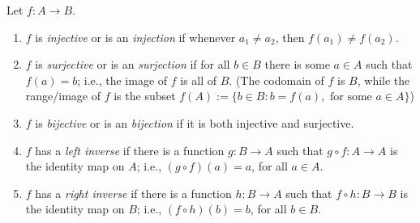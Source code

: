 Let $f:A\to B$.
\begin{enumerate}[(1)]
        \item $f$ is \textit{injective} or is an \textit{injection} if whenever $a_1\neq a_2$, then $f(a_1)\neq f(a_2)$.
        \item $f$ is \textit{surjective} or is an \textit{surjection} if for all $b\in B$ there is some $a\in A$ such that $f(a)=b$; i.e., the image of $f$ is all of $B$. 
        (The codomain of $f$ is $B$, while the range/image of $f$ is the subset $f(A):=\{b\in B:b=f(a), \text{ for some }a\in A\}$)
        \item $f$ is \textit{bijective} or is an \textit{bijection} if it is both injective and surjective.
        \item $f$ has a \textit{left inverse} if there is a function $g:B\to A$ such that $g\circ f:A\to A$ is the identity map on $A$; i.e., $(g\circ f)(a)=a$, for all $a\in A$.
        \item $f$ has a \textit{right inverse} if there is a function $h:B\to A$ such that $f\circ h:B\to B$ is the identity map on $B$; i.e., $(f\circ h)(b)=b$, for all $b\in B$.
    \end{enumerate}
